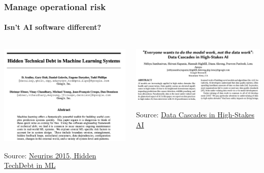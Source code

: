 \begin{frame}
    \frametitle{Manage operational risk}
    \framesubtitle{Isn't AI software different?}
    \begin{columns}[T] %
        \begin{column}{.4\textwidth}
            \begin{center}
                \includegraphics[height=0.35\textheight]{graphics/neurips-hidden-tech-debt}
            \end{center}
            Source: \href{https://proceedings.neurips.cc/paper/2015/hash/86df7dcfd896fcaf2674f757a2463eba-Abstract.html}{Neurips 2015, Hidden TechDebt in ML}
        \end{column}%
        \begin{column}{.4\textwidth}
            \begin{center}
                \includegraphics[height=0.25\textheight]{graphics/data-cascades}
            \end{center}
            Source: \href{https://nithyasambasivancom.files.wordpress.com/2021/01/sambasivan_cascades_chi2021.pdf}{Data Cascades in High-Stakes AI}
        \end{column}%
    \end{columns}

\end{frame}

